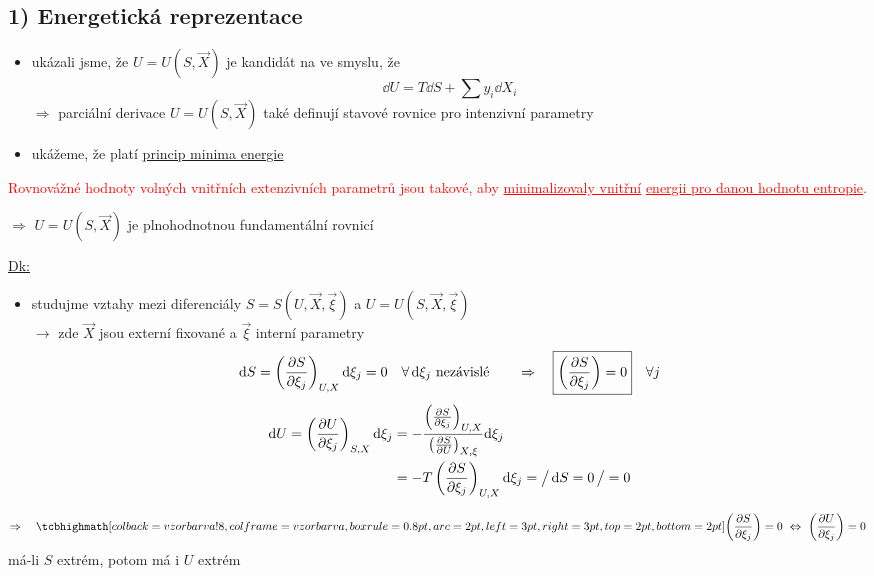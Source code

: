 \subsection*{1) Energetická reprezentace}
\begin{itemize}
  \item ukázali jsme, že $U = U(S,\vec X)$ je kandidát na  ve smyslu, že
  \[ \dd U = T\dd S + \sum y_i\dd X_i \]
  $\Rightarrow$ parciální derivace $U = U(S,\vec X)$ také definují stavové rovnice pro intenzivní parametry
  \item ukážeme, že platí \underline{princip minima energie}
\end{itemize}

\begin{veta}
\textcolor{Red}{Rovnovážné hodnoty volných vnitřních extenzivních parametrů jsou takové, aby \underline{minimalizovaly vnitřní} \underline{energii pro danou hodnotu entropie}.}
\end{veta}
$\Rightarrow$ $U = U(S,\vec X)$ je plnohodnotnou fundamentální rovnicí

\underline{Dk:}
\begin{itemize}
  \item studujme vztahy mezi diferenciály $S = S(U,\vec X,\vec\xi)$ a $U = U(S,\vec X,\vec\xi)$ \\
  $\to$ zde $\vec X$ jsou externí fixované a $\vec\xi$ interní parametry
  \[
    \dd S = \left(\pdv{S}{\xi_j}\right)_{U,X}\dd\xi_j = 0 \quad \forall\,\dd\xi_j \text{ nezávislé}
    \qquad\Rightarrow\quad \boxed{\left(\pdv{S}{\xi_j}\right) = 0} \quad\forall j
  \]
  \begin{align*}
    \dd U = \left(\pdv{U}{\xi_j}\right)_{S,X}\dd\xi_j
      &= -\frac{\left(\pdv{S}{\xi_j}\right)_{U,X}}{\left(\pdv{S}{U}\right)_{X,\xi}}\dd\xi_j \\
      &= -T\left(\pdv{S}{\xi_j}\right)_{U,X}\dd\xi_j = \big/\,\dd S = 0\,\big/ = 0
  \end{align*}
\end{itemize}

\[
  \Rightarrow\quad \vzorec{\left(\pdv{S}{\xi_j}\right) = 0 \ \Leftrightarrow\ \left(\pdv{U}{\xi_j}\right) = 0}
\]
má-li $S$ extrém, potom má i $U$ extrém

